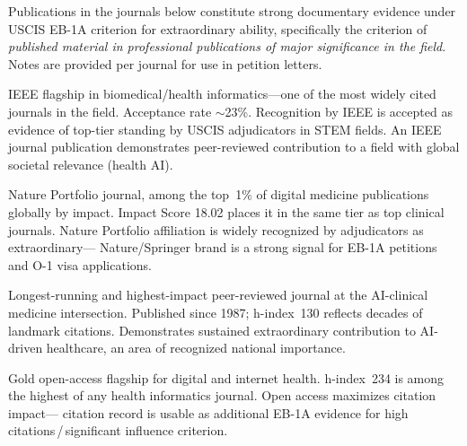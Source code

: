 \documentclass[a4paper,11pt]{article}
\begin{document}
Publications in the journals below constitute strong documentary evidence under USCIS
EB-1A criterion for extraordinary ability, specifically the criterion of
\emph{published material in professional publications of major significance in the
field}. Notes are provided per journal for use in petition letters.

\medskip

\begin{tcolorbox}[journalbox,
  title={IEEE JBHI {\normalfont\small(IS~8.18, Q1, h\,=\,179)}}]
IEEE flagship in biomedical/health informatics---one of the most widely cited journals
in the field. Acceptance rate ${\sim}$23\%. Recognition by IEEE is accepted as evidence
of top-tier standing by USCIS adjudicators in STEM fields. An IEEE journal publication
demonstrates peer-reviewed contribution to a field with global societal relevance
(health AI).
\end{tcolorbox}

\begin{tcolorbox}[journalbox,
  title={npj Digital Medicine {\normalfont\small(IS~18.02, Q1, h\,=\,130)}}]
Nature Portfolio journal, among the top~1\% of digital medicine publications globally
by impact. Impact Score 18.02 places it in the same tier as top clinical journals.
Nature Portfolio affiliation is widely recognized by adjudicators as extraordinary---
Nature/Springer brand is a strong signal for EB-1A petitions and O-1 visa applications.
\end{tcolorbox}

\begin{tcolorbox}[journalbox,
  title={Artificial Intelligence in Medicine {\normalfont\small(IS~9.45, Q1, h\,=\,130)}}]
Longest-running and highest-impact peer-reviewed journal at the AI-clinical medicine
intersection. Published since 1987; h-index~130 reflects decades of landmark citations.
Demonstrates sustained extraordinary contribution to AI-driven healthcare, an area of
recognized national importance.
\end{tcolorbox}

\begin{tcolorbox}[journalbox,
  title={JMIR {\normalfont\small(IS~8.53, Q1, h\,=\,234)}}]
Gold open-access flagship for digital and internet health. h-index~234 is among the
highest of any health informatics journal. Open access maximizes citation impact---
citation record is usable as additional EB-1A evidence for high citations\,/\,significant
influence criterion.
\end{tcolorbox}
\end{document}
